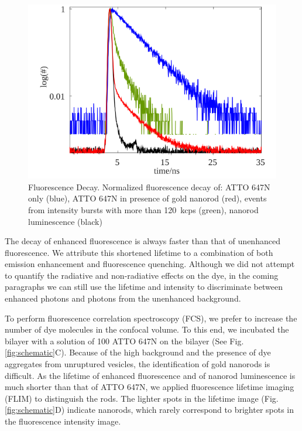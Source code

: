 \begin{figure}
	\centering
	\includegraphics[]{lifetime_enhnc}
	\caption{Fluorescence Decay. Normalized fluorescence decay of: ATTO 647N only (blue), ATTO 647N in presence of gold nanorod (red), events from intensity bursts with more than \SI{120}{kcps} (green), nanorod luminescence (black)}
	\label{fig:lifetime_enhnc}
\end{figure}


The decay of enhanced fluorescence is always faster than that of unenhanced fluorescence.
We attribute this shortened lifetime to a combination of both emission enhancement and fluorescence quenching.
Although we did not attempt to quantify the radiative and non-radiative effects on the dye, in the coming paragraphs we can still use the lifetime and intensity to discriminate between enhanced photons and photons from the unenhanced background.


To perform fluorescence correlation spectroscopy (FCS), we prefer to increase the number of dye molecules in the confocal volume.
To this end, we incubated the bilayer with a solution of \SI{100}{\nM} ATTO 647N on the bilayer (See Fig. \ref{fig:schematic}C).
Because of the high background and the presence of dye aggregates from unruptured vesicles, the identification of gold nanorods is difficult.
As the lifetime of enhanced fluorescence and of nanorod luminescence is much shorter than that of ATTO 647N, we applied fluorescence lifetime imaging (FLIM) to distinguish the rods.
The lighter spots in the lifetime image (Fig.\ref{fig:schematic}D) indicate nanorods, which rarely correspond to brighter spots in the fluorescence intensity image.


